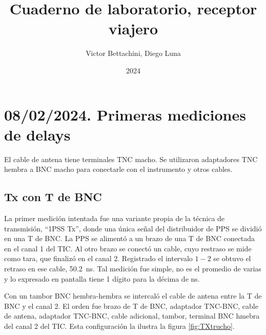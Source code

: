 \documentclass[11pt]{article}
\title{Cuaderno de laboratorio, receptor viajero}
\author{Victor Bettachini, Diego Luna}
\date{2024}
\begin{document}
\maketitle




\newpage
\tableofcontents
\newpage





\section{08/02/2024. Primeras mediciones de delays}

El cable de antena tiene terminales TNC macho.
Se utilizaron adaptadores TNC hembra a BNC macho para conectarle con el instrumento y otros cables.



\subsection{Tx con T de BNC}

La primer medición intentada fue una variante propia de la técnica de transmisión, ``1PSS Tx'', donde una única señal del distribuidor de PPS se dividió en una T de BNC.
La PPS se alimentó a un brazo de una T de BNC conectada en el canal 1 del TIC.
Al otro brazo se conectó un cable, cuyo restraso se mide como tara, que finalizó en el canal 2.
Registrado el intervalo $1 - 2$ se obtuvo el retraso en ese cable, \SI{50.2}{\nano\second}.
Tal medición fue simple, no es el promedio de varias y lo expresado en pantalla tiene 1 dígito para la décima de \si{\nano\second}.

Con un tambor BNC hembra-hembra se intercaló el cable de antena entre la T de BNC y el canal 2.
El orden fue brazo de T de BNC, adaptador TNC-BNC, cable de antena, adaptador TNC-BNC, cable adicional, tambor, terminal BNC hmebra del canal 2 del TIC.
Esta configuración la ilustra la figura \ref{fig:TXtrucho}.
\end{document}

